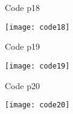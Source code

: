 \documentclass{beamer}
\begin{document}
\begin{frame}{Code p18}
    \begin{minipage}{0.95\textwidth}
        \centering
        \texttt{[image: code18]}
    \end{minipage} 
    
\end{frame}

\begin{frame}{Code p19}
    \begin{minipage}{0.95\textwidth}
        \centering
        \texttt{[image: code19]}
    \end{minipage} 
    
\end{frame}


\begin{frame}{Code p20}
    \begin{minipage}{1.05\textwidth}
        \centering
        \texttt{[image: code20]}
    \end{minipage} 
    
\end{frame}
\end{document}
